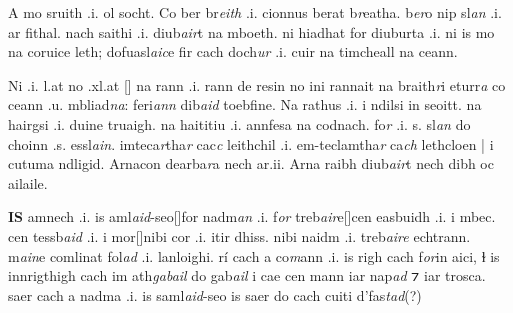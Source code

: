 \documentclass[11pt]{article}
\begin{document}
\begin{pages}
  \begin{Leftside}
    \beginnumbering
    
    \pstart

    A mo sruith .i. ol socht. Co ber br\emph{eith} .i. cionnus berat b\emph{r}eatha.  b\emph{er}o nip sl\emph{an} .i. ar fithal.  nach saithi .i. diub\emph{air}t na mboeth.  ni hiadhat  for diuburta .i. ni is mo na coruice leth; dofuasl\emph{aic}e fir cach doch\emph{ur} .i. cuir na  timcheall na ceann. 
    \pend

    \pstart
    Ni  .i. l.at no .xl.at [\hspace{2mm}] na rann .i. rann de resin  no ini rannait na braith\emph{r}i eturr\emph{a} co ceann .u. mbliad\emph{na}: feri\emph{ann} dib\emph{aid} toebfine.  Na rathus .i. i ndilsi in seoitt. na hairgsi .i. duine truaigh.  na haititiu .i. annfesa na codnach.  fo\emph{r}  .i. s. sl\emph{an} do choinn .s. essl\emph{ain}. imteca\emph{r}tha\emph{r} cac\emph{c} leithchil  .i. em-teclamtha\emph{r} ca\emph{ch} lethcloen | i cutuma ndligid.  Arnacon dearba\emph{r}a nech ar.ii.  Arna raibh diub\emph{air}t nech dibh oc ailaile.
    \pend
    
    \pstart
    \textbf{IS} amnech .i. is aml\emph{aid}-seo[\hspace{2mm}]for nadm\emph{an} .i. f\emph{or} treb\emph{air}e[\hspace{2mm}]cen easbuidh .i. i mbec.  cen tessb\emph{aid} .i. i mor[\hspace{2mm}]nibi cor .i. itir dhiss.  nibi naidm .i. treb\emph{aire} echtrann.  m\emph{ain}e comlinat fol\emph{ad} .i. lanloighi. r\'{i} cach a co\emph{m}ann .i. is righ cach f\emph{or}in  aici, ɫ is innrigthigh cach im ath\emph{gabail} do gab\emph{ail} i cae cen mann iar nap\emph{ad} ⁊ iar trosca.  saer cach a nadma .i. is saml\emph{aid}-seo is saer do cach cuiti  d'fas\emph{tad}(?)
    \pend
    \endnumbering
  \end{Leftside}

  \begin{Rightside}
    \beginnumbering
    

\end{Rightside}
\end{pages}
\end{document}
